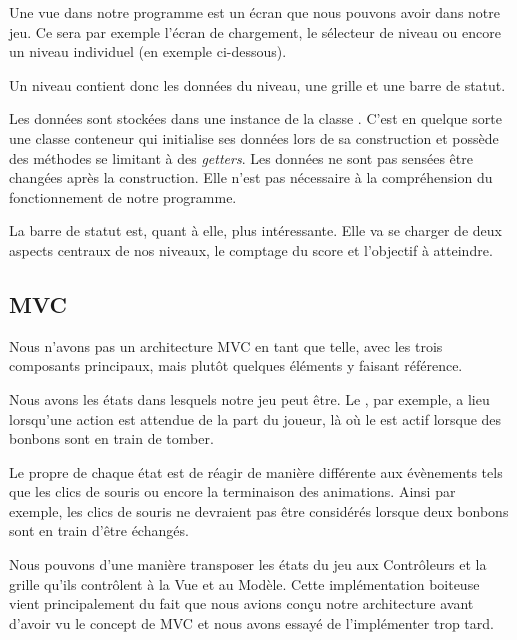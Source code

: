 \documentclass[11pt,a4paper]{article}
\newcommand{\addcode}[3]{
	\begin{figure}[H]
		\centering
		
	\end{figure}
}
\begin{document}
Une vue dans notre programme est un écran que nous pouvons
avoir dans notre jeu. Ce sera par exemple l'écran de
chargement, le sélecteur de niveau ou encore un niveau
individuel (en exemple ci-dessous).

\addcode{code/game.hpp}{C++}{}{}

\addcode{code/view.hpp}{C++}{}{}
\addcode{code/level.hpp}{C++}{}{}

Un niveau contient donc les données du niveau, une grille
et une barre de statut.

Les données sont stockées dans une instance de la classe
\verb@LevelData@. C'est en quelque sorte une classe
conteneur qui initialise ses données lors de sa construction
et possède des méthodes se limitant à des \emph{getters}.
Les données ne sont pas sensées être changées après la
construction. Elle n'est pas nécessaire à la compréhension
du fonctionnement de notre programme.

La barre de statut est, quant à elle, plus intéressante.
Elle va se charger de deux aspects centraux de nos niveaux, le
comptage du score et l'objectif à atteindre.


\subsection{MVC}

Nous n'avons pas un architecture MVC en tant que telle, avec
les trois composants principaux, mais plutôt quelques éléments y
faisant référence.

Nous avons les états dans lesquels notre jeu
peut être. Le \verb@ReadyState@, par exemple, a
lieu lorsqu'une action est attendue de la part du joueur, là
où le \verb@FallState@ est actif lorsque des bonbons sont
en train de tomber.

Le propre de chaque état est de réagir de manière différente
aux évènements tels que les clics de souris ou encore la
terminaison des animations. Ainsi par exemple, les clics de souris ne devraient
pas être considérés lorsque deux bonbons sont en train
d'être échangés.

Nous pouvons d'une manière transposer les états du jeu aux Contrôleurs et la
grille qu'ils contrôlent à la Vue et au Modèle.
Cette implémentation boiteuse vient principalement du fait
que nous avions conçu notre architecture avant d'avoir vu le
concept de MVC et nous avons essayé de l'implémenter trop
tard.
\end{document}

